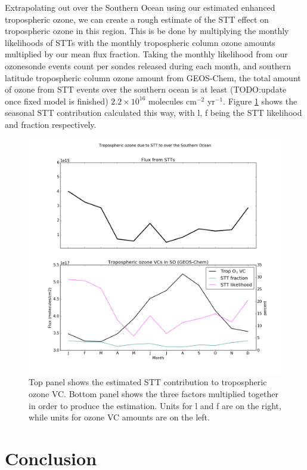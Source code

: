 \documentclass{article}
\begin{document}
  Extrapolating out over the Southern Ocean using our estimated enhanced tropospheric ozone, we can create a rough estimate of the STT effect on tropospheric ozone in this region.
  This is be done by multiplying the monthly likelihoods of STTs with the monthly tropospheric column ozone amounts multiplied by our mean flux fraction.
  Taking the monthly likelihood from our ozonesonde events count per sondes released during each month, and southern latitude tropospheric column ozone amount from GEOS-Chem, the total amount of ozone from STT events over the southern ocean is at least (TODO:update once fixed model is finished) $2.2\times10^{16}$ molecules cm$^{-2}$ yr$^{-1}$.
  Figure \ref{fig:SOExtrapolation} shows the seasonal STT contribution calculated this way, with l, f being the STT likelihood and fraction respectively.
    
  \begin{figure}[!htbp]
    \includegraphics[width=\textwidth]{figures/SO_extrapolation.png}
    \caption{Top panel shows the estimated STT contribution to tropospheric ozone VC. Bottom panel shows the three factors multiplied together in order to produce the estimation. Units for l and f are on the right, while units for ozone VC amounts are on the left.}
    \label{fig:SOExtrapolation}
  \end{figure}
  

\section{Conclusion}
  
\end{document}
